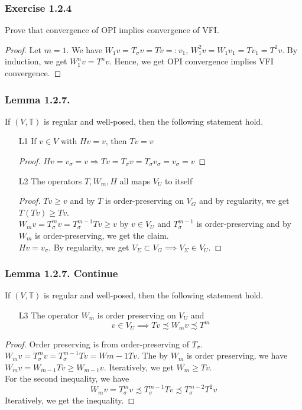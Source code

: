 \documentclass[11pt,xcolor={dvipsnames},hyperref={pdftex,pdfpagemode=UseNone,hidelinks,pdfdisplaydoctitle=true},usepdftitle=false]{beamer}
\begin{document}
\begin{frame}
\frametitle{Exercise 1.2.4}
Prove that convergence of OPI implies convergence of VFI.
\begin{proof}
Let $m=1$. We have $W_1 v = T_\sigma v = Tv=:v_1$, $W_1^2 v = W_1 v_1 = Tv_1= T^2 v$. By induction, we get $W_1^nv = T^nv$. Hence, we get OPI convergence implies VFI convergence.
\end{proof}
\end{frame}

\begin{frame}
\frametitle{Lemma 1.2.7.}
If $(V,\mathbb{T})$ is regular and well-posed, then the following statement hold.
\begin{enumerate}
\item[L1] If $v\in V$ with $Hv=v$, then $Tv=v$
\begin{proof}
$Hv= v_\sigma =v\Rightarrow T v = T_\sigma v = T_\sigma v_\sigma = v_\sigma =v$
\end{proof}
\item[L2] The operators $T, W_m, H$ all maps $V_U$ to itself
\begin{proof}
$Tv\ge v$ and by $T$ is order-preserving on $V_G$ and by regularity, we get $T(Tv)\ge Tv$.\\
$W_m v = T_\sigma^m v = T_\sigma^{m-1}Tv\ge v$ by $v\in V_U$ and $T_\sigma^{m-1}$ is order-preserving and by $W_m$ is order-preserving, we get the claim.\\
$Hv = v_\sigma$. By regularity, we get $V_\Sigma\subset V_G\implies V_\Sigma\in V_U$.
\end{proof}
\end{enumerate}
\end{frame}

\begin{frame}
\frametitle{Lemma 1.2.7. Continue}
If $(V,\mathbb{T})$ is regular and well-posed, then the following statement hold.
\begin{enumerate}
\item[L3] The operator $W_m$ is order preserving on $V_U$ and
$$
v\in V_U\implies Tv\precsim W_m v\precsim T^m
$$
\end{enumerate}
\begin{proof}
Order preserving is from order-preserving of $T_\sigma$.\\
$W_m v = T_\sigma^m v = T_\sigma^{m-1}Tv = W{m-1} Tv$. The by $W_m$ is order preserving, we have $W_m v = W_{m-1} Tv\ge W_{m-1}v$. Iteratively, we get $W_m \ge Tv$.\\
For the second inequality, we have
$$
W_m v = T_\sigma^m v\precsim T_\sigma^{m-1} Tv\precsim T_\sigma^{m-2} T^2v
$$
Iteratively, we get the inequality.
\end{proof}
\end{frame}
\end{document}
